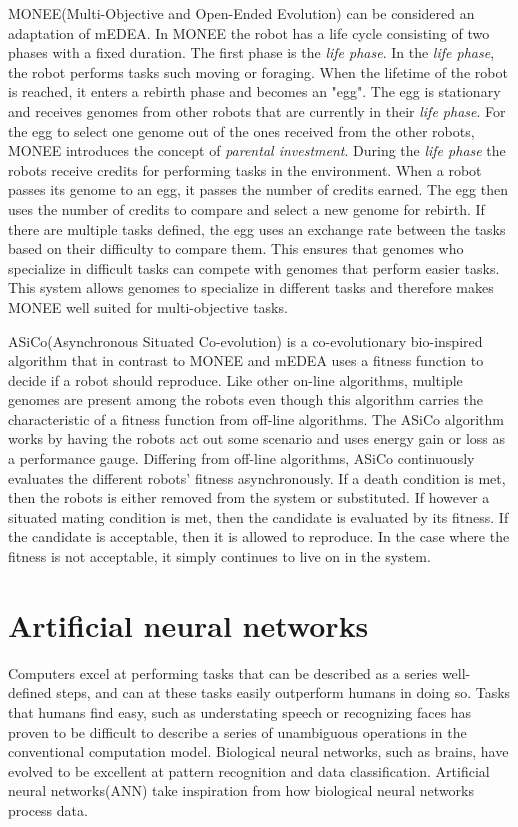 MONEE(Multi-Objective and Open-Ended Evolution) can be considered an adaptation of mEDEA.
In MONEE the robot has a life cycle consisting of two phases with a fixed duration.
The first phase is the \emph{life phase}.
In the \emph{life phase}, the robot performs tasks such moving or foraging.
When the lifetime of the robot is reached, it enters a rebirth phase and becomes an "egg".
The egg is stationary and receives genomes from other robots that are currently in their \emph{life phase}.
For the egg to select one genome out of the ones received from the other robots, MONEE introduces the concept of \emph{parental investment}.
During the \emph{life phase} the robots receive credits for performing tasks in the environment.
When a robot passes its genome to an egg, it passes the number of credits earned.
The egg then uses the number of credits to compare and select a new genome for rebirth.
If there are multiple tasks defined, the egg uses an exchange rate between the tasks based on their difficulty to compare them. 
This ensures that genomes who specialize in difficult tasks can compete with genomes that perform easier tasks. 
This system allows genomes to specialize in different tasks and therefore makes MONEE well suited for multi-objective tasks.

ASiCo(Asynchronous Situated Co-evolution) is a co-evolutionary bio-inspired algorithm that in contrast to MONEE and mEDEA uses a fitness function to decide if a robot should reproduce.
Like other on-line algorithms, multiple genomes are present among the robots even though this algorithm carries the characteristic of a fitness function from off-line algorithms.
The ASiCo algorithm works by having the robots act out some scenario and uses energy gain or loss as a performance gauge. 
Differing from off-line algorithms, ASiCo continuously evaluates the different robots' fitness asynchronously.
If a death condition is met, then the robots is either removed from the system or substituted. 
If however a situated mating condition is met, then the candidate is evaluated by its fitness.
If the candidate is acceptable, then it is allowed to reproduce.
In the case where the fitness is not acceptable, it simply continues to live on in the system.

\section{Artificial neural networks}
Computers excel at performing tasks that can be described as a series well-defined steps, and can at these tasks easily outperform humans in doing so.
Tasks that humans find easy, such as understating speech or recognizing faces has proven to be difficult to describe a series of unambiguous operations in the conventional computation model.
Biological neural networks, such as brains, have evolved to be excellent at pattern recognition and data classification.
Artificial neural networks(ANN) take inspiration from how biological neural networks process data.

